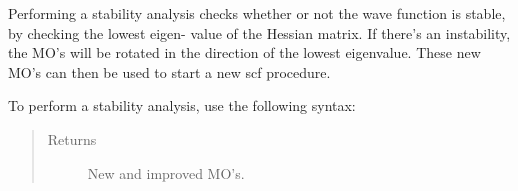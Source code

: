 \documentclass[letterpaper,10pt,english]{sphinxmanual}
\begin{document}
\begin{fulllineitems}
\begin{fulllineitems}
\begin{quote}
\begin{description}
\end{description}\end{quote}

\end{fulllineitems}


\begin{fulllineitems}
\label{\detokenize{UHF:hf.UHF.UHF.stability}}
Performing a stability analysis checks whether or not the wave function is stable, by checking the lowest eigen-
value of the Hessian matrix. If there’s an instability, the MO’s will be rotated in the direction
of the lowest eigenvalue. These new MO’s can then be used to start a new scf procedure.

To perform a stability analysis, use the following syntax:

\begin{sphinxVerbatim}[commandchars=\\\{\}]
           
   
  
\end{sphinxVerbatim}
\begin{quote}\begin{description}
\item[{Returns}] \leavevmode
New and improved MO’s.

\end{description}\end{quote}


\end{fulllineitems}
\end{fulllineitems}
\end{document}
